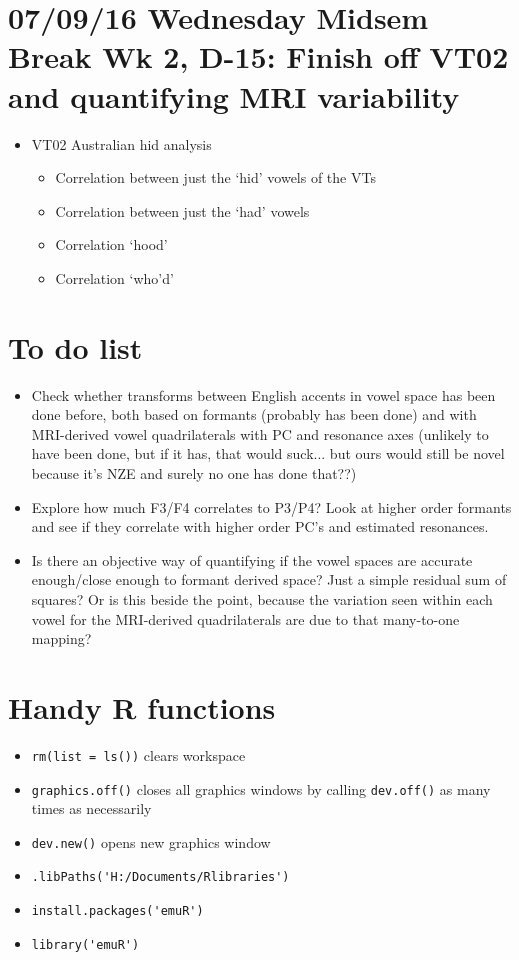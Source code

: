 \documentclass{article}
\begin{document}
\section*{07/09/16 Wednesday Midsem Break Wk 2, D-15: Finish off VT02 and quantifying MRI variability}
\begin{itemize}
    \item VT02 Australian hid analysis
    \begin{itemize}
        \item Correlation between just the `hid' vowels of the VTs
        \item Correlation between just the `had' vowels
        \item Correlation `hood'
        \item Correlation `who'd'
    \end{itemize}
\end{itemize}

\section*{To do list}
\begin{itemize}
    \item Check whether transforms between English accents in vowel space has been done before, both based on formants (probably has been done) and with MRI-derived vowel quadrilaterals with PC and resonance axes (unlikely to have been done, but if it has, that would suck... but ours would still be novel because it's NZE and surely no one has done that??)
    \item Explore how much F3/F4 correlates to P3/P4? Look at higher order formants and see if they correlate with higher order PC's and estimated resonances.
    \item Is there an objective way of quantifying if the vowel spaces are accurate enough/close enough to formant derived space? Just a simple residual sum of squares? Or is this beside the point, because the variation seen within each vowel for the MRI-derived quadrilaterals are due to that many-to-one mapping?
\end{itemize}

\section*{Handy R functions}
\begin{itemize}
    \item \verb|rm(list = ls())| clears workspace
    \item \verb|graphics.off()| closes all graphics windows by calling \verb|dev.off()| as many times as necessarily
    \item \verb|dev.new()| opens new graphics window
    \item \verb|.libPaths('H:/Documents/Rlibraries')|
    \item \verb|install.packages('emuR')|
    \item \verb|library('emuR')|
\end{itemize}
\end{document}
